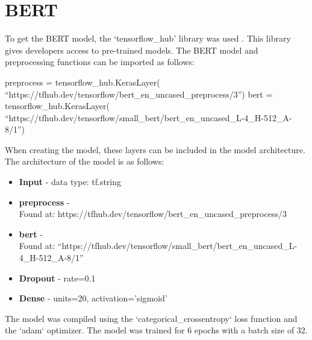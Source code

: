 \section{BERT}
To get the BERT model, the `tensorflow\_hub' library was used \cite{tensorflow_hub}. This library gives developers access to pre-trained models. The BERT model and preprocessing functions
can be imported as follows:
\begin{algorithm}
    \begin{algorithmic}
        \STATE preprocess = tensorflow\_hub.KerasLayer(
        \bindent
        \STATE ``https://tfhub.dev/tensorflow/bert\_en\_uncased\_preprocess/3'')
        \eindent
        \STATE bert = tensorflow\_hub.KerasLayer(
        \bindent
        \STATE``https://tfhub.dev/tensorflow/small\_bert/bert\_en\_uncased\_L-4\_H-512\_A-8/1'')
        \eindent
    \end{algorithmic}
\end{algorithm}

When creating the model, these layers can be included in the model architecture. The architecture of the model is as follows:
\begin{itemize}
    \item \textbf{Input} - data type: tf.string
    \item \textbf{preprocess} - \\Found at: https://tfhub.dev/tensorflow/bert\_en\_uncased\_preprocess/3
    \item \textbf{bert} - \\Found at: ``https://tfhub.dev/tensorflow/small\_bert/bert\_en\_uncased\_L-4\_H-512\_A-8/1''
    \item \textbf{Dropout} - rate=0.1
    \item \textbf{Dense} - units=20, activation='sigmoid'
\end{itemize}

The model was compiled using the `categorical\_crossentropy` loss function and the `adam` optimizer. The model was trained for 6 epochs with a batch size of 32.
